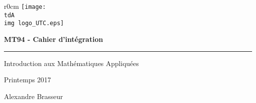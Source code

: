 \begin{titlepage}
	\selectfont 
	{
		\begin{wrapfigure}{r}{0cm}
			\texttt{[image: \\tdA\\img logo\_UTC.eps]}
		\end{wrapfigure}

	}


	\begin{center} 
		\textbf{\Huge MT94 - Cahier d'intégration}
		\hrule
		\vspace{.5cm}

		\LARGE
		Introduction aux Mathématiques Appliquées

		Printemps 2017

		\vspace{1cm}

		{Alexandre Brasseur}
	\end{center}


	\begin{center} 
		\large
	\end{center}
\end{titlepage}